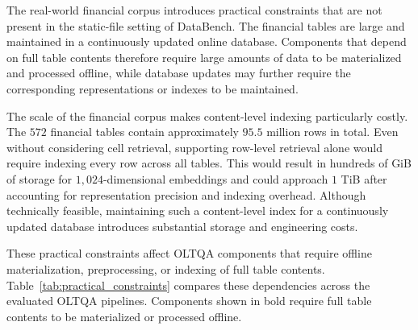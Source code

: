 The real-world financial corpus introduces practical constraints that are not present in the static-file setting of DataBench.
The financial tables are large and maintained in a continuously updated online database.
Components that depend on full table contents therefore require large amounts of data to be materialized and processed offline, while database updates may further require the corresponding representations or indexes to be maintained.

The scale of the financial corpus makes content-level indexing particularly costly.
The $572$ financial tables contain approximately $95.5$ million rows in total.
Even without considering cell retrieval, supporting row-level retrieval alone would require indexing every row across all tables.
This would result in hundreds of GiB of storage for $1{,}024$-dimensional embeddings and could approach $1$ TiB after accounting for representation precision and indexing overhead.
Although technically feasible, maintaining such a content-level index for a continuously updated database introduces substantial storage and engineering costs.

These practical constraints affect OLTQA components that require offline materialization, preprocessing, or indexing of full table contents.
Table~\ref{tab:practical_constraints} compares these dependencies across the evaluated OLTQA pipelines.
Components shown in bold require full table contents to be materialized or processed offline.

